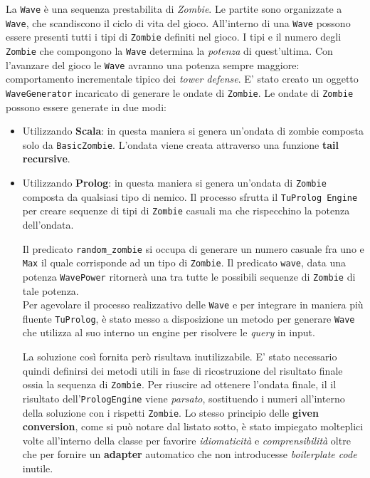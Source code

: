 La \texttt{Wave} è una sequenza prestabilita di \textit{Zombie}. Le partite sono organizzate a \texttt{Wave}, che scandiscono il ciclo di vita del gioco. All'interno di una \texttt{Wave} possono essere presenti tutti i tipi di \texttt{Zombie} definiti nel gioco. I tipi e il numero degli \texttt{Zombie} che compongono la \texttt{Wave} determina la \textit{potenza} di quest'ultima. Con l'avanzare del gioco le \texttt{Wave} avranno una potenza sempre maggiore: comportamento incrementale tipico dei \textit{tower defense}. E' stato creato un oggetto \texttt{WaveGenerator} incaricato di generare le ondate di \texttt{Zombie}. Le ondate di \texttt{Zombie} possono essere generate in due modi:
\begin{itemize}
    \item Utilizzando \textbf{Scala}: in questa maniera si genera un'ondata di zombie composta solo da \texttt{BasicZombie}. L'ondata viene creata attraverso una funzione \textbf{tail recursive}.
    
    \item Utilizzando \textbf{Prolog}: in questa maniera si genera un'ondata di \texttt{Zombie} composta da qualsiasi tipo di nemico. Il processo sfrutta il \texttt{TuProlog Engine} per creare sequenze di tipi di \texttt{Zombie} casuali ma che rispecchino la potenza dell'ondata.
    
    Il predicato \texttt{random\_zombie} si occupa di generare un numero casuale fra uno e \texttt{Max} il quale corrisponde ad un tipo di \texttt{Zombie}. Il predicato \texttt{wave}, data una potenza \texttt{WavePower} ritornerà una tra tutte le possibili sequenze di \texttt{Zombie} di tale potenza.\\

    Per agevolare il processo realizzativo delle \texttt{Wave} e per integrare in maniera più fluente \texttt{TuProlog}, è stato messo a disposizione un metodo per generare \texttt{Wave} che utilizza al suo interno un engine per risolvere le \textit{query} in input.

    

    La soluzione così fornita però risultava inutilizzabile. E' stato necessario quindi definirsi dei metodi utili in fase di ricostruzione del risultato finale ossia la sequenza di \texttt{Zombie}. Per riuscire ad ottenere l'ondata finale, il il risultato dell'\texttt{PrologEngine} viene \textit{parsato}, sostituendo i numeri all'interno della soluzione con i rispetti \texttt{Zombie}. Lo stesso principio delle \textbf{given conversion}, come si può notare dal listato sotto, è stato impiegato molteplici volte all'interno della classe per favorire \textit{idiomaticità} e \textit{comprensibilità} oltre che per fornire un \textbf{adapter} automatico che non introducesse \textit{boilerplate code} inutile.

    

\end{itemize}